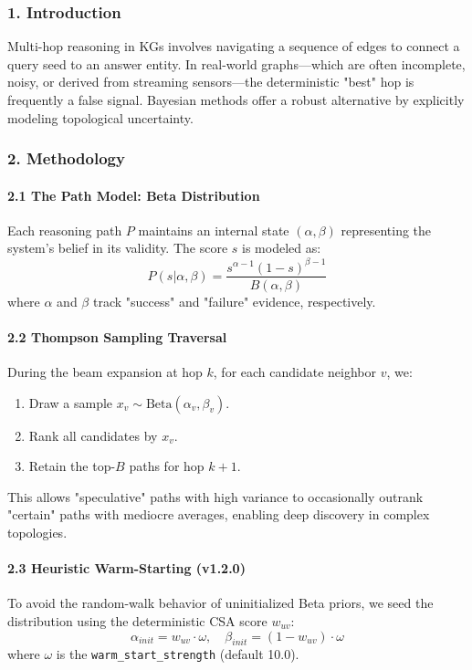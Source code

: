 \documentclass[10pt,journal,compsoc]{IEEEtran}
\begin{document}
\subsubsection{1. Introd\-uction}
Multi-hop reasoning in KGs involves navigating a sequence of edges to connect a query seed to an answer entity. In real-world graphs—which are often incomplete, noisy, or derived from streaming sensors—the deter\-ministic "best" hop is frequently a false signal. Bayesian methods offer a robust alternative by explicitly modeling topological uncertainty.

\subsubsection{2. Methodology}

\paragraph{2.1 The Path Model: Beta Distri\-bution}
Each reasoning path $P$ maintains an internal state $(\alpha, \beta)$ repre\-senting the system's belief in its validity. The score $s$ is modeled as:
\begin{equation}
P(s | \alpha, \beta) = \frac{s^{\alpha-1} (1-s)^{\beta-1}}{B(\alpha, \beta)}
\end{equation}
where $\alpha$ and $\beta$ track "success" and "failure" evidence, respe\-ctively.

\paragraph{2.2 Thompson Sampling Traversal}
During the beam expansion at hop $k$, for each candidate neighbor $v$, we:
\begin{enumerate}
\item Draw a sample $x_v \sim \text{Beta}(\alpha_v, \beta_v)$.
\item Rank all candidates by $x_v$.
\item Retain the top-$B$ paths for hop $k+1$.

\end{enumerate}
This allows "speculative" paths with high variance to occas\-ionally outrank "certain" paths with mediocre averages, enabling deep discovery in complex topologies.

\paragraph{2.3 Heuristic Warm-Starting (v1.2.0)}
To avoid the random-walk behavior of unini\-tialized Beta priors, we seed the distr\-ibution using the deter\-ministic CSA score $w_{uv}$:
\begin{equation}
\alpha_{init} = w_{uv} \cdot \omega, \quad \beta_{init} = (1-w_{uv}) \cdot \omega
\end{equation}
where $\omega$ is the \texttt{warm\_start\_strength} (default 10.0).
\end{document}
